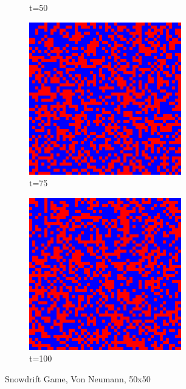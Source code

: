 \documentclass[a4paper, 11pt]{article}
\begin{document}
\begin{figure}[H]
\begin{subfigure}{.25\textwidth}
  \caption{t=50}
\end{subfigure}%
\begin{subfigure}{.25\textwidth}
  \centering
  \includegraphics[width=0.9\linewidth]{SNOWDRIFT_VON_NEUMANN_50x50_t75}
  \caption{t=75}
\end{subfigure}%
\begin{subfigure}{.25\textwidth}
  \centering
  \includegraphics[width=0.9\linewidth]{SNOWDRIFT_VON_NEUMANN_50x50_t100}
  \caption{t=100}
\end{subfigure}
\caption{Snowdrift Game, Von Neumann, 50x50}
\end{figure}
\end{document}
